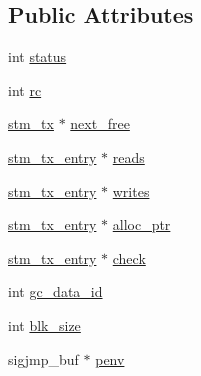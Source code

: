 \subsection*{Public Attributes}
\begin{DoxyCompactItemize}
\item 
int \hyperlink{structstm__tx__st_a1a63d8bd2ac112e17241b81773f3de75}{status}
\item 
int \hyperlink{structstm__tx__st_a1fcafa795a98eb07e0822ce72aff5b05}{rc}
\item 
\hyperlink{stm_8h_aa6edafeae971e657c7f732ffe5a9d026}{stm\-\_\-tx} $\ast$ \hyperlink{structstm__tx__st_af8d4d49ab6f2e8c9d152974334c7960e}{next\-\_\-free}
\item 
\hyperlink{stm__fraser_8c_a4aacc05bcf38ac11ac911641876db633}{stm\-\_\-tx\-\_\-entry} $\ast$ \hyperlink{structstm__tx__st_ac348497da14526917aede588c08fcecf}{reads}
\item 
\hyperlink{stm__fraser_8c_a4aacc05bcf38ac11ac911641876db633}{stm\-\_\-tx\-\_\-entry} $\ast$ \hyperlink{structstm__tx__st_a9572cc71b02430ce9ccd5e305dd313f3}{writes}
\item 
\hyperlink{stm__fraser_8c_a4aacc05bcf38ac11ac911641876db633}{stm\-\_\-tx\-\_\-entry} $\ast$ \hyperlink{structstm__tx__st_a0a3260211b0c776d7d27671e42534e5b}{alloc\-\_\-ptr}
\item 
\hyperlink{stm__fraser_8c_a4aacc05bcf38ac11ac911641876db633}{stm\-\_\-tx\-\_\-entry} $\ast$ \hyperlink{structstm__tx__st_a990b6b92bfd85204ee8c519180187493}{check}
\item 
int \hyperlink{structstm__tx__st_ac61720100a57333033d7a51eb26808eb}{gc\-\_\-data\-\_\-id}
\item 
int \hyperlink{structstm__tx__st_ab1803cee4d1835e6faacd1305f2d1d05}{blk\-\_\-size}
\item 
sigjmp\-\_\-buf $\ast$ \hyperlink{structstm__tx__st_a3e1745e8e19bae7c5da6790562210648}{penv}
\end{DoxyCompactItemize}



